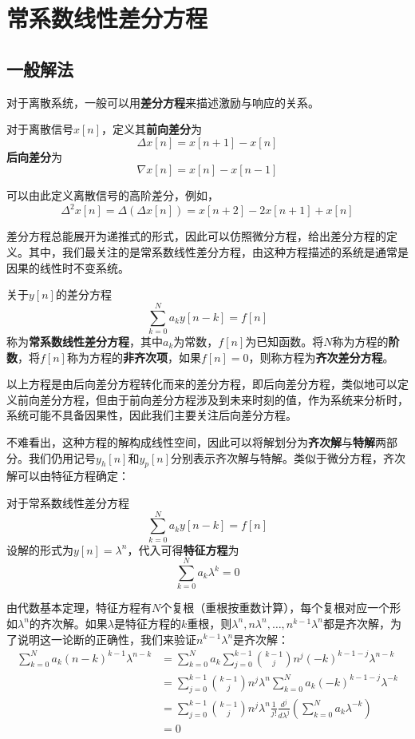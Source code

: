 \section{常系数线性差分方程}

\subsection{一般解法}\label{sub:difference_equation}

对于离散系统，一般可以用\textbf{差分方程}来描述激励与响应的关系。

\begin{definition}[差分]
    对于离散信号$x[n]$，定义其\textbf{前向差分}为
    $$\Delta x[n]=x[n+1]-x[n]$$
    \textbf{后向差分}为
    $$\nabla x[n]=x[n]-x[n-1]$$
\end{definition}

可以由此定义离散信号的高阶差分，例如，
$$\Delta^2 x[n]=\Delta(\Delta x[n])=x[n+2]-2x[n+1]+x[n]$$

差分方程总能展开为递推式的形式，因此可以仿照微分方程，给出差分方程的定义。其中，我们最关注的是常系数线性差分方程，由这种方程描述的系统是通常是因果的线性时不变系统。
\begin{definition}[常系数线性差分方程]
    关于$y[n]$的差分方程
    $$\sum_{k=0}^{N}a_k y[n-k] = f[n]$$
    称为\textbf{常系数线性差分方程}，其中$a_k$为常数，$f[n]$为已知函数。将$N$称为方程的\textbf{阶数}，将$f[n]$称为方程的\textbf{非齐次项}，如果$f[n]=0$，则称方程为\textbf{齐次差分方程}。
\end{definition}

以上方程是由后向差分方程转化而来的差分方程，即后向差分方程，类似地可以定义前向差分方程，但由于前向差分方程涉及到未来时刻的值，作为系统来分析时，系统可能不具备因果性，因此我们主要关注后向差分方程。

不难看出，这种方程的解构成线性空间，因此可以将解划分为\textbf{齐次解}与\textbf{特解}两部分。我们仍用记号$y_h[n]$和$y_p[n]$分别表示齐次解与特解。类似于微分方程，齐次解可以由特征方程确定：
\begin{definition}[常系数线性差分方程的特征方程]
    对于常系数线性差分方程
    $$\sum_{k=0}^{N}a_k y[n-k] = f[n]$$
    设解的形式为$y[n]=\lambda^n$，代入可得\textbf{特征方程}为
    $$\sum_{k=0}^{N}a_k \lambda^k = 0$$
\end{definition}

由代数基本定理，特征方程有$N$个复根（重根按重数计算），每个复根对应一个形如$\lambda^n$的齐次解。如果$\lambda$是特征方程的$k$重根，则$\lambda^n,n\lambda^n,\dots,n^{k-1}\lambda^n$都是齐次解，为了说明这一论断的正确性，我们来验证$n^{k-1}\lambda^n$是齐次解：\begin{align*}
    \sum_{k=0}^{N}a_k (n-k)^{k-1}\lambda^{n-k}&=\sum_{k=0}^{N}a_k \sum_{j=0}^{k-1}\binom{k-1}{j}n^j(-k)^{k-1-j}\lambda^{n-k}\\
    &=\sum_{j=0}^{k-1}\binom{k-1}{j}n^j\lambda^n\sum_{k=0}^{N}a_k (-k)^{k-1-j}\lambda^{-k}\\
    &=\sum_{j=0}^{k-1}\binom{k-1}{j}n^j\lambda^n\frac{1}{j!}\frac{d^{j}}{d\lambda^{j}}\left(\sum_{k=0}^{N}a_k \lambda^{-k}\right)\\
    &=0
\end{align*}

